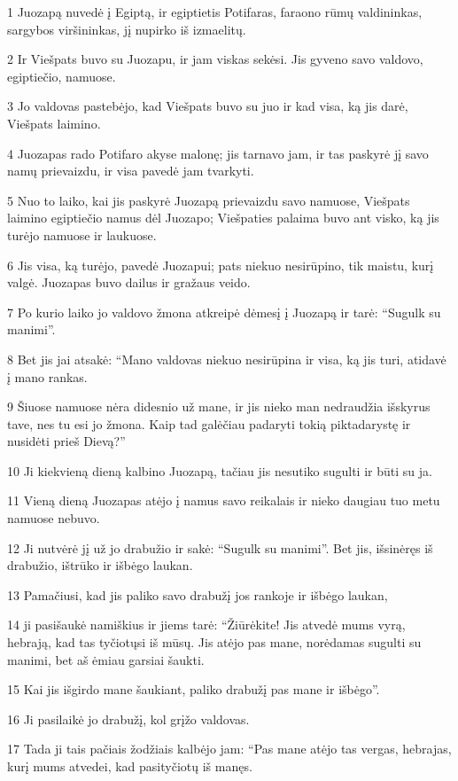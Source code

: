 \par 1 Juozapą nuvedė į Egiptą, ir egiptietis Potifaras, faraono rūmų valdininkas, sargybos viršininkas, jį nupirko iš izmaelitų. 
\par 2 Ir Viešpats buvo su Juozapu, ir jam viskas sekėsi. Jis gyveno savo valdovo, egiptiečio, namuose. 
\par 3 Jo valdovas pastebėjo, kad Viešpats buvo su juo ir kad visa, ką jis darė, Viešpats laimino. 
\par 4 Juozapas rado Potifaro akyse malonę; jis tarnavo jam, ir tas paskyrė jį savo namų prievaizdu, ir visa pavedė jam tvarkyti. 
\par 5 Nuo to laiko, kai jis paskyrė Juozapą prievaizdu savo namuose, Viešpats laimino egiptiečio namus dėl Juozapo; Viešpaties palaima buvo ant visko, ką jis turėjo namuose ir laukuose. 
\par 6 Jis visa, ką turėjo, pavedė Juozapui; pats niekuo nesirūpino, tik maistu, kurį valgė. Juozapas buvo dailus ir gražaus veido. 
\par 7 Po kurio laiko jo valdovo žmona atkreipė dėmesį į Juozapą ir tarė: “Sugulk su manimi”. 
\par 8 Bet jis jai atsakė: “Mano valdovas niekuo nesirūpina ir visa, ką jis turi, atidavė į mano rankas. 
\par 9 Šiuose namuose nėra didesnio už mane, ir jis nieko man nedraudžia išskyrus tave, nes tu esi jo žmona. Kaip tad galėčiau padaryti tokią piktadarystę ir nusidėti prieš Dievą?” 
\par 10 Ji kiekvieną dieną kalbino Juozapą, tačiau jis nesutiko sugulti ir būti su ja. 
\par 11 Vieną dieną Juozapas atėjo į namus savo reikalais ir nieko daugiau tuo metu namuose nebuvo. 
\par 12 Ji nutvėrė jį už jo drabužio ir sakė: “Sugulk su manimi”. Bet jis, išsinėręs iš drabužio, ištrūko ir išbėgo laukan. 
\par 13 Pamačiusi, kad jis paliko savo drabužį jos rankoje ir išbėgo laukan, 
\par 14 ji pasišaukė namiškius ir jiems tarė: “Žiūrėkite! Jis atvedė mums vyrą, hebrają, kad tas tyčiotųsi iš mūsų. Jis atėjo pas mane, norėdamas sugulti su manimi, bet aš ėmiau garsiai šaukti. 
\par 15 Kai jis išgirdo mane šaukiant, paliko drabužį pas mane ir išbėgo”. 
\par 16 Ji pasilaikė jo drabužį, kol grįžo valdovas. 
\par 17 Tada ji tais pačiais žodžiais kalbėjo jam: “Pas mane atėjo tas vergas, hebrajas, kurį mums atvedei, kad pasityčiotų iš manęs. 
